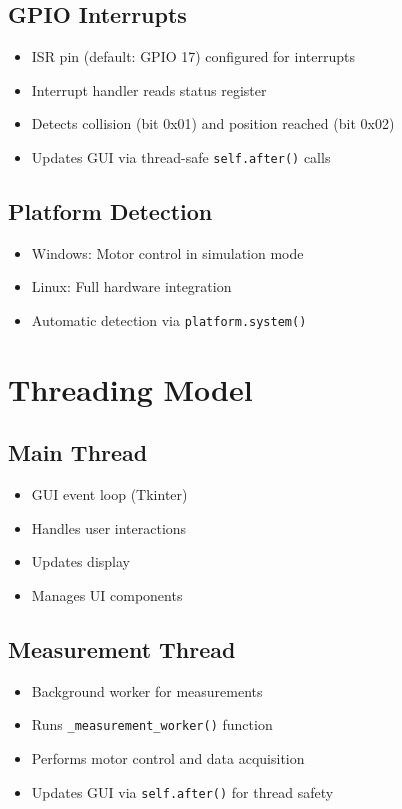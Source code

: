 \documentclass[11pt,a4paper]{article}
\begin{document}
\subsection{GPIO Interrupts}
\begin{itemize}
    \item ISR pin (default: GPIO 17) configured for interrupts
    \item Interrupt handler reads status register
    \item Detects collision (bit 0x01) and position reached (bit 0x02)
    \item Updates GUI via thread-safe \texttt{self.after()} calls
\end{itemize}

\subsection{Platform Detection}
\begin{itemize}
    \item Windows: Motor control in simulation mode
    \item Linux: Full hardware integration
    \item Automatic detection via \texttt{platform.system()}
\end{itemize}

\section{Threading Model}

\subsection{Main Thread}
\begin{itemize}
    \item GUI event loop (Tkinter)
    \item Handles user interactions
    \item Updates display
    \item Manages UI components
\end{itemize}

\subsection{Measurement Thread}
\begin{itemize}
    \item Background worker for measurements
    \item Runs \texttt{\_measurement\_worker()} function
    \item Performs motor control and data acquisition
    \item Updates GUI via \texttt{self.after()} for thread safety
\end{itemize}
\end{document}
